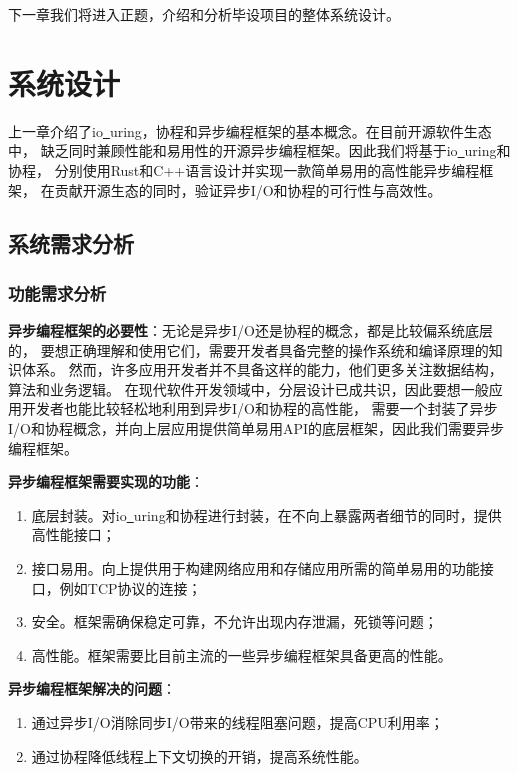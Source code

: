 \documentclass[supercite]{HustGraduPaper}
\theoremstyle{definition}
\begin{document}
下一章我们将进入正题，介绍和分析毕设项目的整体系统设计。\par

\section{系统设计}
上一章介绍了io\underline{~}uring，协程和异步编程框架的基本概念。在目前开源软件生态中，
缺乏同时兼顾性能和易用性的开源异步编程框架。因此我们将基于io\underline{~}uring和协程，
分别使用Rust和C++语言设计并实现一款简单易用的高性能异步编程框架，
在贡献开源生态的同时，验证异步I/O和协程的可行性与高效性。\par

\subsection{系统需求分析}

\subsubsection{功能需求分析}

\textbf{异步编程框架的必要性}：无论是异步I/O还是协程的概念，都是比较偏系统底层的，
要想正确理解和使用它们，需要开发者具备完整的操作系统和编译原理的知识体系。
然而，许多应用开发者并不具备这样的能力，他们更多关注数据结构，算法和业务逻辑。
在现代软件开发领域中，分层设计已成共识，因此要想一般应用开发者也能比较轻松地利用到异步I/O和协程的高性能，
需要一个封装了异步I/O和协程概念，并向上层应用提供简单易用API的底层框架，因此我们需要异步编程框架。\par

\textbf{异步编程框架需要实现的功能}：
\begin{enumerate}
  \item 底层封装。对io\underline{~}uring和协程进行封装，在不向上暴露两者细节的同时，提供高性能接口；
  \item 接口易用。向上提供用于构建网络应用和存储应用所需的简单易用的功能接口，例如TCP协议的连接；
  \item 安全。框架需确保稳定可靠，不允许出现内存泄漏，死锁等问题；
  \item 高性能。框架需要比目前主流的一些异步编程框架具备更高的性能。
\end{enumerate}

\textbf{异步编程框架解决的问题}：
\begin{enumerate}
  \item 通过异步I/O消除同步I/O带来的线程阻塞问题，提高CPU利用率；
  \item 通过协程降低线程上下文切换的开销，提高系统性能。
\end{enumerate}
\end{document}
